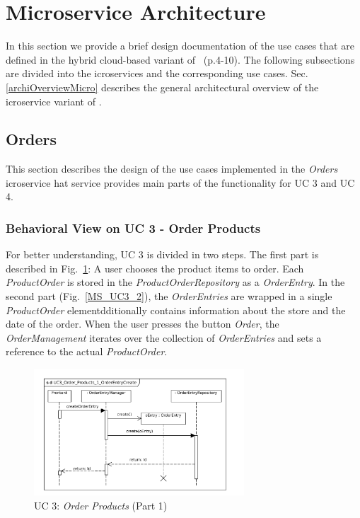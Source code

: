 \newpage

\section{Microservice Architecture} \label{MS}
In this section we provide a brief design documentation of the use cases that are defined in the hybrid cloud-based variant of \CoCoME~\cite{herold2008}(p.4-10).
The following subsections are divided into the icroservices and the corresponding use cases. 
Sec.\ref{archiOverviewMicro} describes the general architectural overview of the icroservice variant of \CoCoME.
	



	\FloatBarrier
		\subsection{Orders}
		This section describes the design of the use cases implemented in the \textit{Orders} icroservice
		hat service provides main parts of the functionality for UC 3 and UC 4.

		\subsubsection*{Behavioral View on UC 3 - Order Products} 
		For  better understanding, UC 3 is divided in two steps. The first part is described in Fig.~\ref{MS_UC3_1}: A user chooses the product items to order. Each \textit{ProductOrder} is stored in the \textit{ProductOrderRepository} as a \textit{OrderEntry}. In the second part (Fig.~\ref{MS_UC3_2}), the \textit{OrderEntries} are wrapped in a single \textit{ProductOrder} elementdditionally contains information about the store and the date of the order. When the user presses the button \textit{Order}, the \textit{OrderManagement} iterates over the collection of \textit{OrderEntries} and sets a reference to the actual \textit{ProductOrder}.
	

		
			\begin{figure}[!h]
				\centering
				\includegraphics[width = 0.7\textwidth]{img/UC3_Order_Products_1_OrderEntryCreate.pdf}
				\caption{UC 3: \textit{Order Products} (Part 1)}
				\label{MS_UC3_1}
			\end{figure}
			
